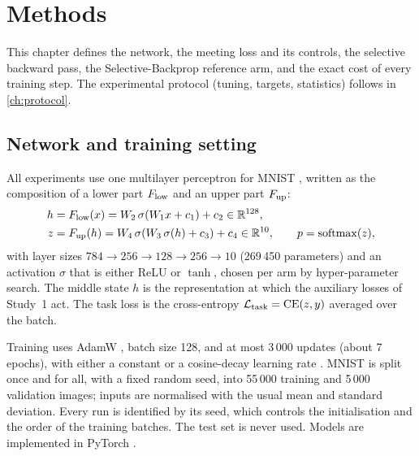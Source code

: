 \chapter{Methods}\label{ch:methods}

This chapter defines the network, the meeting loss and its controls, the selective backward pass, the Selective-Backprop reference arm, and the exact cost of every training step. The experimental protocol (tuning, targets, statistics) follows in \cref{ch:protocol}.

\section{Network and training setting}\label{sec:setting}
All experiments use one multilayer perceptron for MNIST \citep{lecun1998gradient}, written as the composition of a lower part $F_{\mathrm{low}}$ and an upper part $F_{\mathrm{up}}$:
\begin{align}
h &= F_{\mathrm{low}}(x) = W_2\,\sigma(W_1 x + c_1) + c_2 \in\mathbb{R}^{128}, \\
z &= F_{\mathrm{up}}(h) = W_4\,\sigma(W_3\,\sigma(h) + c_3) + c_4 \in\mathbb{R}^{10}, \qquad p=\mathrm{softmax}(z),
\end{align}
with layer sizes $784\to256\to128\to256\to10$ (269\,450 parameters) and an activation $\sigma$ that is either ReLU or $\tanh$, chosen per arm by hyper-parameter search. The middle state $h$ is the representation at which the auxiliary losses of Study~1 act. The task loss is the cross-entropy $\mathcal{L}_{\mathrm{task}}=\mathrm{CE}(z,y)$ averaged over the batch.

Training uses AdamW \citep{kingma2015adam,loshchilov2019decoupled}, batch size 128, and at most 3\,000 updates (about 7 epochs), with either a constant or a cosine-decay learning rate \citep{loshchilov2017sgdr}. MNIST is split once and for all, with a fixed random seed, into 55\,000 training and 5\,000 validation images; inputs are normalised with the usual mean and standard deviation. Every run is identified by its seed, which controls the initialisation and the order of the training batches. The test set is never used. Models are implemented in PyTorch \citep{paszke2019pytorch}.

